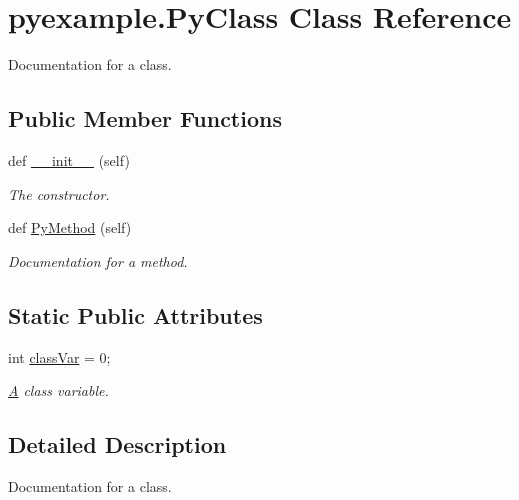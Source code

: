 \hypertarget{classpyexample_1_1_py_class}{}\section{pyexample.\+Py\+Class Class Reference}
\label{classpyexample_1_1_py_class}


Documentation for a class.  


\subsection*{Public Member Functions}
\begin{DoxyCompactItemize}
\item 
\mbox{\label{classpyexample_1_1_py_class_a87e20fe7e81cb5a1c04e620c076ab8ac}} 
def \mbox{\hyperlink{classpyexample_1_1_py_class_a87e20fe7e81cb5a1c04e620c076ab8ac}{\+\_\+\+\_\+init\+\_\+\+\_\+}} (self)
\begin{DoxyCompactList}\small\item\em The constructor. \end{DoxyCompactList}\item 
def \mbox{\hyperlink{classpyexample_1_1_py_class_a654596774eb28a0c6d26eea565de3a9d}{Py\+Method}} (self)
\begin{DoxyCompactList}\small\item\em Documentation for a method. \end{DoxyCompactList}\end{DoxyCompactItemize}
\subsection*{Static Public Attributes}
\begin{DoxyCompactItemize}
\item 
\mbox{\label{classpyexample_1_1_py_class_abd17aff54e5b0ca194020c796c733546}} 
int \mbox{\hyperlink{classpyexample_1_1_py_class_abd17aff54e5b0ca194020c796c733546}{class\+Var}} = 0;
\begin{DoxyCompactList}\small\item\em \mbox{\hyperlink{class_a}{A}} class variable. \end{DoxyCompactList}\end{DoxyCompactItemize}


\subsection{Detailed Description}
Documentation for a class. 

